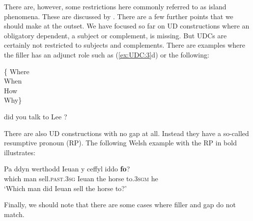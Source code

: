 \documentclass[output=paper
	        ,collection
	        ,collectionchapter
 	        ,biblatex
                ,babelshorthands
                ,newtxmath
                ,draftmode
                ,colorlinks, citecolor=brown
]{langscibook}
\begin{document}
{  \noindent There are, however, some
  restrictions here commonly referred to as island phenomena. These
  are discussed by .  There are a few
  further points that we should make at the outset. We have focused so
  far on UD constructions where an obligatory dependent, a subject or
  complement, is missing. But UDCs are certainly not restricted to
  subjects and complements.  There are examples where the filler has
  an adjunct role such as (\ref{ex:UDC:3}d) or the following:

  \begin{exe} \ex \label{ex:UDC:6} \begin{avm}
      \{ \normalfont Where\\ \normalfont When\\ \normalfont How\\
      \normalfont Why\} \end{avm} did you talk to Lee
    \trace{}?  \end{exe}

  \noindent 
  There are also UD constructions with no gap at all. Instead they
  have a so-called resumptive pronoun (RP). The following Welsh
  example with the RP in bold illustrates:

  \begin{exe} \ex \label{ex:UDC:7}
  \gll Pa ddyn werthodd Ieuan y ceffyl iddo \textbf{fo}?\\
  which man sell.\textsc{past.3sg} Ieuan the horse to\textsc{.3sgm} he\\
  \glt `Which man did Ieuan sell the horse to?'  \end{exe}

\noindent
Finally, we should note that there are some cases where filler and gap
do not match.

\begin{exe} \ex \begin{xlist} \label{ex:UDC:8}     \end{xlist} \end{exe}

}
\end{document}
